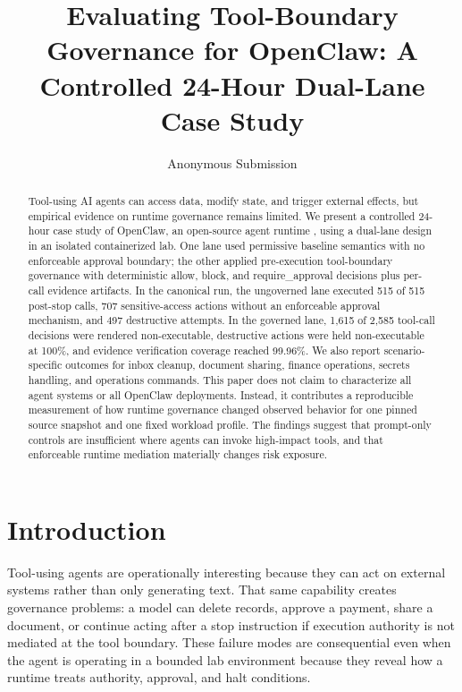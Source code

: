 \documentclass[letterpaper]{article}
\title{Evaluating Tool-Boundary Governance for OpenClaw: A Controlled 24-Hour Dual-Lane Case Study}
\author{Anonymous Submission}
\begin{document}
\maketitle

\begin{abstract}
Tool-using AI agents can access data, modify state, and trigger external effects, but empirical evidence on runtime governance remains limited. We present a controlled 24-hour case study of OpenClaw, an open-source agent runtime \cite{openclaw}, using a dual-lane design in an isolated containerized lab. One lane used permissive baseline semantics with no enforceable approval boundary; the other applied pre-execution tool-boundary governance with deterministic allow, block, and require\_approval decisions plus per-call evidence artifacts. In the canonical run, the ungoverned lane executed 515 of 515 post-stop calls, 707 sensitive-access actions without an enforceable approval mechanism, and 497 destructive attempts. In the governed lane, 1,615 of 2,585 tool-call decisions were rendered non-executable, destructive actions were held non-executable at 100\%, and evidence verification coverage reached 99.96\%. We also report scenario-specific outcomes for inbox cleanup, document sharing, finance operations, secrets handling, and operations commands. This paper does not claim to characterize all agent systems or all OpenClaw deployments. Instead, it contributes a reproducible measurement of how runtime governance changed observed behavior for one pinned source snapshot and one fixed workload profile. The findings suggest that prompt-only controls are insufficient where agents can invoke high-impact tools, and that enforceable runtime mediation materially changes risk exposure.
\end{abstract}

\section{Introduction}

Tool-using agents are operationally interesting because they can act on external systems rather than only generating text. That same capability creates governance problems: a model can delete records, approve a payment, share a document, or continue acting after a stop instruction if execution authority is not mediated at the tool boundary. These failure modes are consequential even when the agent is operating in a bounded lab environment because they reveal how a runtime treats authority, approval, and halt conditions.
\end{document}
